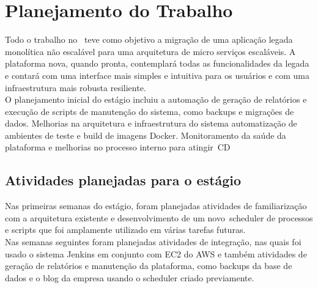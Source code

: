 \chapter{Planejamento do Trabalho}\label{chap:atividadesPlanejadas}

Todo o trabalho no \nomeEmpresa~teve como objetivo a migração de uma aplicação legada monolítica não escalável para uma arquitetura de micro serviços escaláveis. A plataforma nova, quando pronta, contemplará todas as funcionalidades da legada e contará com uma interface mais simples e intuitiva para os usuários e com uma infraestrutura mais robusta resiliente. \\

O planejamento inicial do estágio incluiu a automação de geração de relatórios e execução de scripts de manutenção do sistema, como backups e migrações de dados. Melhorias na arquitetura e infraestrutura do sistema automatização de ambientes de teste e build de imagens \gls{Docker}. Monitoramento da saúde da plataforma e melhorias no processo interno para atingir~\gls{CD}\\


\section{Atividades planejadas para o estágio}



Nas primeiras semanas do estágio, foram planejadas atividades de familiarização com a arquitetura existente e desenvolvimento de um novo~\gls{scheduler} de processos e scripts que foi amplamente utilizado em várias tarefas futuras.\\

Nas semanas seguintes foram planejadas atividades de integração, nas quais foi usado o sistema \gls{Jenkins} em conjunto com \gls{EC2} do \gls{AWS} e também atividades de geração de relatórios e manutenção da plataforma, como backups da base de dados e o blog da empresa usando o \gls{scheduler} criado previamente.\\

